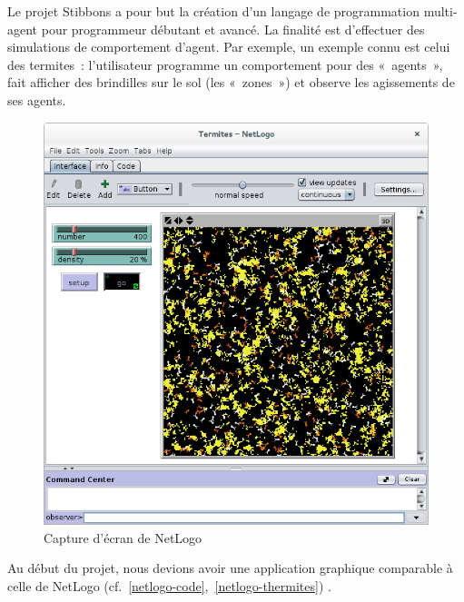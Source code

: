
Le projet Stibbons a pour but la création d'un langage de programmation multi-agent pour programmeur débutant et avancé.
La finalité est d'effectuer des simulations de comportement d'agent. Par exemple, un exemple connu est celui des termites~: l'utilisateur programme un comportement pour des «~agents~», fait afficher des brindilles sur le sol (les «~zones~») et observe les agissements de ses agents.

\begin{figure}[h]
\centering
\includegraphics[scale=0.3]{doc/gestionProjet/netlogo-termites.png}
\caption{\label{netlogo-termites} Capture d'écran de NetLogo}
\end{figure}

Au début du projet, nous devions avoir une application graphique comparable à celle de NetLogo (cf.~\ref{netlogo-code},~\ref{netlogo-thermites}) .

